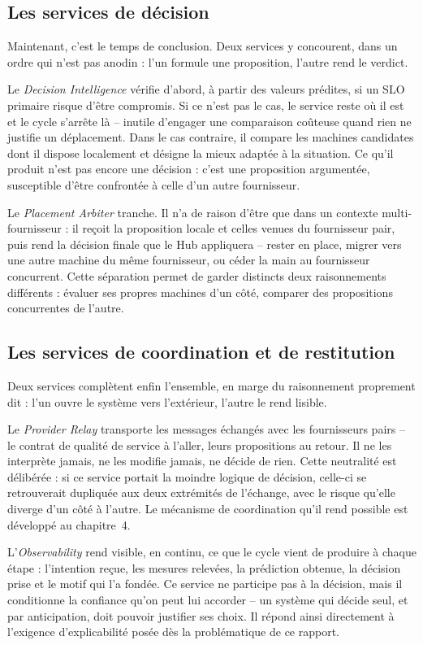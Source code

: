 \subsection{Les services de décision}
Maintenant, c'est le temps de conclusion. Deux services y concourent, dans un ordre qui n'est pas anodin : l'un formule une proposition, l'autre rend le verdict.

Le \emph{Decision Intelligence} vérifie d'abord, à partir des valeurs prédites, si un SLO primaire risque d'être compromis. Si ce n'est pas le cas, le service reste où il est et le cycle s'arrête là -- inutile d'engager une comparaison coûteuse quand rien ne justifie un déplacement. Dans le cas contraire, il compare les machines candidates dont il dispose localement et désigne la mieux adaptée à la situation. Ce qu'il produit n'est pas encore une décision : c'est une proposition argumentée, susceptible d'être confrontée à celle d'un autre fournisseur.

Le \emph{Placement Arbiter} tranche. Il n'a de raison d'être que dans un contexte multi-fournisseur : il reçoit la proposition locale et celles venues du fournisseur pair, puis rend la décision finale que le Hub appliquera -- rester en place, migrer vers une autre machine du même fournisseur, ou céder la main au fournisseur concurrent. Cette séparation permet de garder distincts deux raisonnements différents : évaluer ses propres machines d'un côté, comparer des propositions concurrentes de l'autre.

\subsection{Les services de coordination et de restitution}
Deux services complètent enfin l'ensemble, en marge du raisonnement proprement dit : l'un ouvre le système vers l'extérieur, l'autre le rend lisible.

Le \emph{Provider Relay} transporte les messages échangés avec les fournisseurs pairs -- le contrat de qualité de service à l'aller, leurs propositions au retour. Il ne les interprète jamais, ne les modifie jamais, ne décide de rien. Cette neutralité est délibérée : si ce service portait la moindre logique de décision, celle-ci se retrouverait dupliquée aux deux extrémités de l'échange, avec le risque qu'elle diverge d'un côté à l'autre. Le mécanisme de coordination qu'il rend possible est développé au chapitre~4.

L'\emph{Observability} rend visible, en continu, ce que le cycle vient de produire à chaque étape : l'intention reçue, les mesures relevées, la prédiction obtenue, la décision prise et le motif qui l'a fondée. Ce service ne participe pas à la décision, mais il conditionne la confiance qu'on peut lui accorder -- un système qui décide seul, et par anticipation, doit pouvoir justifier ses choix. Il répond ainsi directement à l'exigence d'explicabilité posée dès la problématique de ce rapport.

